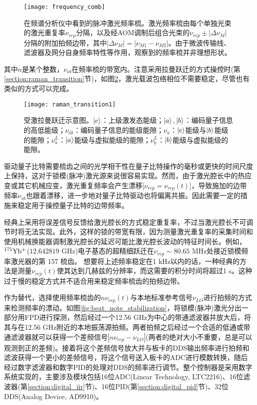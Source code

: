 \begin{figure}
    \centering
    \texttt{[image: frequency\_comb]}
    \caption[脉冲激光频率梳]{在频谱分析仪中看到的脉冲激光频率梳。激光频率梳由每个单独光束的激光重复率$\nu_{rep}$分隔，以及经AOM调制后组合光束的$\nu_{rep}\pm |\Delta \nu_M|$分隔的附加拍频边带，其中$|\Delta \nu_M|=|\nu_{M1}-\nu_{M2}|$。由于微波传输线、滤波器及网分自身频率特性等作用，观察到的频率梳并非理想形状。\label{fig:frequency_comb}}
\end{figure}
其中$n$是某个整数，$\nu_{sb}$在频率梳的带宽内。注意采用拉曼跃迁的方式操控时(第\ref{section:raman_transition}节)，如图\ref{fig:raman_transition1}，激光载波包络相位不需要稳定\cite[]{Peer_Shapiro_Stowe_Shapiro_Ye_2007}，尽管也有类似的方式可以完成\cite[]{Koke_Grebing_Frei_Anderson_Assion_Steinmeyer_2010}。

\begin{figure}
    \centering
    \texttt{[image: raman\_transition1]}
    \caption[受激拉曼跃迁示意图]{受激拉曼跃迁示意图。$\ket{e}$：上级激发态能级；$\ket{a},\ket{b}$：编码量子信息的高低能级；$\nu_{ab}$：编码量子信息的能级能隙；$\nu_{a}$：$\ket{e}$能级与$\ket{b}$能级的能隙；$\nu_a^L$：$\ket{a}$能级与虚拟能级的能隙；$\nu_b^L$：$\ket{b}$能级与虚拟能级的能隙。\label{fig:raman_transition1}}
\end{figure}

驱动量子比特需要梳齿之间的光学相干性在量子比特操作的毫秒或更快的时间尺度上保持，这对于锁模(脉冲)激光源来说很容易实现\cite[]{Hayes_Matsukevich_Maunz_Hucul_Quraishi_Olmschenk_Campbell_Mizrahi_Senko_Monroe_2010}。然而，由于激光腔长中的热应变或其它机械应变，激光重复频率会产生漂移[$\nu_{rep}=\nu_{rep}(t)$]，导致施加的边带频率$\nu_{sb}$也跟着漂移，进一步地对量子比特驱动也将偏离共振。因此需要一定的措施来稳定用于操控量子比特的边带频率。

经典上采用将误差信号反馈给激光腔长的方式稳定重复率，不过当激光腔长不可调节时将无法实现。此外，这样的锁的带宽有限，因为测量激光重复率的采集时间和使用机械换能器调制激光腔长的延迟可能比激光腔长波动的特征时间长。例如，$\rm ^{171}Yb^+$($12.642819 $ GHz)电子基态的超精细跃迁在$ \nu_{rep} \sim 80.65$ MHz处接近锁模频率激光器的第 157 梳齿。
想要将上述频率稳定在1 kHz以内的话，一种经典的方法是测量$\nu_{rep}(t)$使其达到几赫兹的分辨率，而这需要的积分时间将超过1 s\cite[]{Islam_Campbell_Choi_Clark_Conover_Debnath_Edwards_Fields_Hayes_Hucul_et_al_2014}。这种过于慢的稳定方式并不适合用来稳定频率梳齿的拍频边带。

作为替代，选择使用频率梳齿的$n\nu_{rep}(t)$与本地标准参考信号$\nu_{LO}$进行拍频的方式来检测频率的漂动。如图\ref{fig:beat_note_stabilization}，将锁模(脉冲)激光分出一部分用FPD进行探测，然后经过一个12.56 GHz为中心的带通滤波器并放大后，将其与在12.56 GHz附近的本地振荡源拍频。两者拍频之后经过一个合适的低通或带通滤波器就可以获得一个差频信号$|n\nu_{rep}-\nu_{LO}|$(两者的绝对大小不重要，总是可以观测到正的差频)。接着将这个差频信号放大并与板卡的DDS输出频率进行拍频和滤波获得一个更小的差频信号，将这个信号送入板卡的ADC进行模数转换，随后经过数字滤波器和数字PID的处理对DDS的频率进行调节。整个控制器是采用数字系统实现的，主要涉及模块包括16位ADC(Linear Technology, LTC2216)、16位滤波器(第\ref{section:digital_iir}节)、16位PID(第\ref{section:digital_pid}节)、32位DDS(Analog Device, AD9910)。



